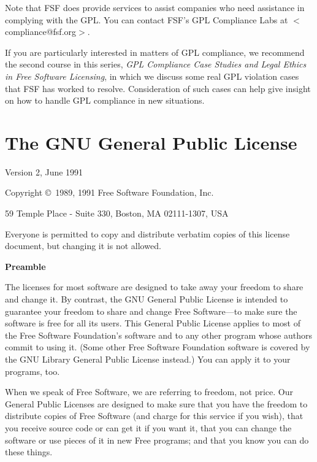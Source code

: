 \documentclass[11pt, letterpaper]{book}
\begin{document}
Note that FSF does provide services to assist companies who need
assistance in complying with the GPL. You can contact FSF's GPL
Compliance Labs at $<$compliance@fsf.org$>$.

If you are particularly interested in matters of GPL compliance, we
recommend the second course in this series, {\em GPL Compliance Case
  Studies and Legal Ethics in Free Software Licensing\/}, in which we
discuss some real GPL violation cases that FSF has worked to resolve.
Consideration of such cases can help give insight on how to handle GPL
compliance in new situations.

\backmatter

\appendix

\chapter{The GNU General Public License}

\begin{center}
{\parindent 0in

Version 2, June 1991

Copyright \copyright\ 1989, 1991 Free Software Foundation, Inc.

\bigskip

59 Temple Place - Suite 330, Boston, MA  02111-1307, USA

\bigskip

Everyone is permitted to copy and distribute verbatim copies
of this license document, but changing it is not allowed.
}
\end{center}

\begin{center}
{\bf\large Preamble}
\end{center}


The licenses for most software are designed to take away your freedom
to share and change it. By contrast, the GNU General Public License is
intended to guarantee your freedom to share and change Free
Software---to make sure the software is free for all its users. This
General Public License applies to most of the Free Software
Foundation's software and to any other program whose authors commit to
using it. (Some other Free Software Foundation software is covered by
the GNU Library General Public License instead.) You can apply it to
your programs, too.

When we speak of Free Software, we are referring to freedom, not price.
Our General Public Licenses are designed to make sure that you have the
freedom to distribute copies of Free Software (and charge for this service
if you wish), that you receive source code or can get it if you want it,
that you can change the software or use pieces of it in new Free programs;
and that you know you can do these things.
\end{document}
